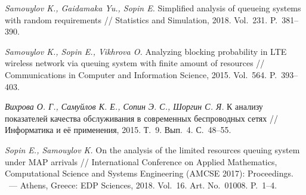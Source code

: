 \documentclass[a4paper,12pt]{article}
\begin{document}
\begin{enumerate}
\textit{Samouylov K., Gaidamaka Yu., Sopin E.}
Simplified analysis of queueing systems with random requirements // {Statistics and Simulation}, 2018. Vol.~231. P.~381--390.

\textit{Samouylov K., Sopin E., Vikhrova O.}
Analyzing blocking probability in LTE wireless network via queuing system with finite amount of resources // {Communications in Computer and Information Science}, 2015. Vol.~564. P.~393--403.

\textit{Вихрова О. Г., Самуйлов К. Е., Сопин Э. С., Шоргин С. Я.}
К анализу показателей качества обслуживания в современных беспроводных сетях // {Информатика и её применения}, 2015. Т.~9. Вып.~4. С.~48--55.

\textit{Sopin E., Samouylov K.}
On the analysis of the limited resources queuing system under MAP arrivals // {International Conference on Applied Mathematics, Computational Science and Systems Engineering (AMCSE 2017): Proceedings}. ~--- Athens, Greece: EDP Sciences, 2018. Vol.~16. Art. No.~01008. P.~1--4.


\end{enumerate}
\end{document}
